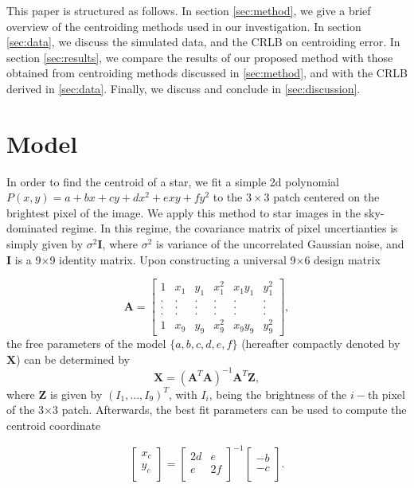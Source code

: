 \documentclass[12pt, preprint]{aastex}
\newcommand{\beq}{\begin{equation}}
\newcommand{\eeq}{\end{equation}}
\begin{document}
This paper is structured as follows. In section \ref{sec:method},
we give a brief overview of the centroiding methods used in our investigation.
In section \ref{sec:data}, we discuss the simulated data, and the CRLB on centroiding error.
In section \ref{sec:results}, we compare the results of our proposed method with 
those obtained from centroiding methods discussed in \ref{sec:method}, and 
with the CRLB derived in \ref{sec:data}. Finally, we discuss and conclude
in \ref{sec:discussion}.               

\section{Model}\label{sec:model}

In order to find the centroid of a star, we fit a simple 2d polynomial $P(x,y)=a+bx+cy+dx^2+exy+fy^2$ to the $3\times3$ patch centered on the brightest pixel of the
image. We apply this method to star images in the sky-dominated regime. In this regime, the covariance matrix of pixel uncertianties is simply given by $\sigma^{2}\mathbf{I}$, where $\sigma^{2}$ is variance of the uncorrelated Gaussian noise, and $\mathbf{I}$ is a 9$\times$9 identity matrix. Upon constructing a universal 9$\times$6 design matrix

\begin{equation}
    \mathbf{A} = 
    \begin{bmatrix}
        1 & x_{1} & y_{1} & x_{1}^{2} & x_{1}y_{1} & y_{1}^{2} \\
        . & . & . & . & . & .  \\
        . & . & . & . & . & .  \\
        . & . & . & . & . & .  \\
        1 & x_{9} & y_{9} & x_{9}^{2} & x_{9}y_{9} & y_{9}^{2}
    \end{bmatrix},
\end{equation}
the free parameters of the model $\{a,b,c,d,e,f\}$ (hereafter compactly denoted by $\mathbf{X}$) can be determined by 
\beq
\mathbf{X} = (\mathbf{A}^{T}\mathbf{A})^{-1}\mathbf{A}^{T}\mathbf{Z},
\label{linearfit}
\eeq
where $\mathbf{Z}$ is given by $(I_{1},...,I_{9})^{T}$, with $I_{i}$, being the brightness of the $i-$th pixel of the 3$\times$3 patch. Afterwards, the best fit parameters can be used to compute the centroid coordinate

\beq
  \begin{bmatrix}
      x_{c}\\
      y_{c}\\
  \end{bmatrix} = 
  \begin{bmatrix}
      2d & e\\
      e & 2f\\
  \end{bmatrix}^{-1}
  \begin{bmatrix}
      -b\\
      -c\\
  \end{bmatrix}.
\label{center}
\eeq
\end{document}
